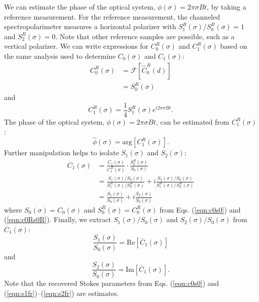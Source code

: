 \documentclass[10pt]{article}
\numberwithin{equation}{subsection}
\begin{document}
We can estimate the phase of the optical system, $\phi(\sigma) = 2 \pi \sigma B t$, by taking a reference measurement.
For the reference measurement, the channeled spectropolarimeter measures a horizontal polarizer with $S_1^R(\sigma) / S_0^R(\sigma) = 1$ and $S_2^R(\sigma) = 0$.
Note that other reference samples are possible, such as a vertical polarizer.
We can write expressions for $C_0^R(\sigma)$ and $C_1^R(\sigma)$ based on the same analysis used to determine $C_0(\sigma)$ and $C_1(\sigma)$:
\begin{equation}
    \begin{split}
        C_0^R(\sigma) &= \mathcal F \left[ \widehat{C}_0^R(d) \right] \\
        &= S_0^R(\sigma)
    \end{split}
    \label{eqn:c0Rs0R}
\end{equation}
and
\begin{equation}
    C_1^R(\sigma) = \frac{1}{4} S_1^R(\sigma) e^{i 2 \pi \sigma B t}.
\end{equation}
%
The phase of the optical system, $\phi(\sigma) = 2 \pi \sigma B t$, can be estimated from $C_1^R(\sigma)$:
\begin{equation}
    \widehat{\phi}(\sigma) = \text{arg} \left[ C_1^R(\sigma) \right].
    \label{eqn:phihat}
\end{equation}
%
Further manipulation helps to isolate $S_1(\sigma)$ and $S_2(\sigma)$:
\begin{equation}
    \begin{split}
        \overline{C}_1(\sigma) &= \frac{C_1(\sigma)}{C_1^R(\sigma)} \cdot \frac{S_0^R(\sigma)}{S_0(\sigma)} \\
        &= \frac{S_1(\sigma) / S_0(\sigma)}{S_1^R(\sigma) / S_0^R(\sigma)} + i \frac{S_2(\sigma) / S_0(\sigma)}{S_1^R(\sigma) / S_0^R(\sigma)} \\
        &= \frac{S_1(\sigma)}{S_0(\sigma)} + i \frac{S_2(\sigma)}{S_0(\sigma)}
    \end{split}
\end{equation}
%
where $S_0(\sigma) = C_0(\sigma)$ and $S_0^R(\sigma) = C_0^R(\sigma)$ from Eqs. (\ref{eqn:c0s0}) and (\ref{eqn:c0Rs0R}).
Finally, we extract $S_1(\sigma)/S_0(\sigma)$ and $S_2(\sigma)/S_0(\sigma)$ from $\overline{C}_1(\sigma)$:
%
\begin{equation}
    \frac{S_1(\sigma)}{S_0(\sigma)} = \text{Re} \left[ \overline{C}_1(\sigma) \right]
    \label{eqn:s1fr}
\end{equation}
%
and
%
\begin{equation}
    \frac{S_2(\sigma)}{S_0(\sigma)} = \text{Im} \left[ \overline{C}_1(\sigma) \right].
    \label{eqn:s2fr}
\end{equation}
Note that the recovered Stokes parameters from Eqs. (\ref{eqn:c0s0}) and (\ref{eqn:s1fr})--(\ref{eqn:s2fr}) are estimates.
\end{document}
